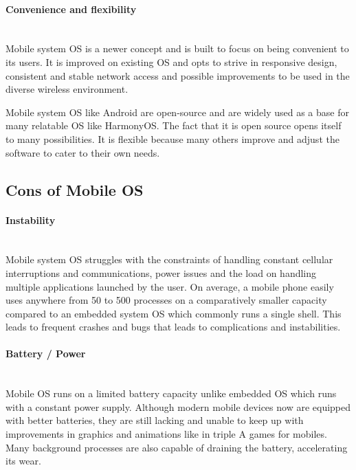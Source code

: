 \documentclass[conference]{IEEEtran}
\newcommand{\forceindent}{\leavevmode{\parindent=1em\indent}}
\begin{document}
\bigskip
\paragraph{Convenience and flexibility} \mbox{} \\
\forceindent Mobile  system OS is a newer concept and is built to focus on being convenient to its users. It is improved on existing OS and opts to strive in responsive design, consistent and stable network access and possible improvements to be used in the diverse wireless environment\cite{technopedia}.

Mobile system OS like Android are open-source and are widely used as a base for many relatable OS like HarmonyOS. The fact that it is open source opens itself to many possibilities. It is flexible because many others improve and adjust the software to cater to their own needs.

\subsection{Cons of Mobile OS}
\paragraph{Instability} \mbox{} \\
\forceindent Mobile system OS struggles with the constraints of handling constant cellular interruptions and communications, power issues and the load on handling multiple applications launched by the user\cite{AAWP}. On average, a mobile phone easily uses anywhere from 50 to 500 processes on a comparatively smaller capacity compared to an embedded system OS which commonly runs a single shell. This leads to frequent crashes and bugs that leads to complications and instabilities.

\bigskip
\paragraph{Battery / Power} \mbox{} \\
\forceindent Mobile OS runs on a limited battery capacity unlike embedded OS which runs with a constant power supply. Although modern mobile devices now are equipped with better batteries, they are still lacking and unable to keep up with improvements in graphics and animations like in triple A games for mobiles. Many background processes are also capable of draining the battery, accelerating its wear.
\end{document}
